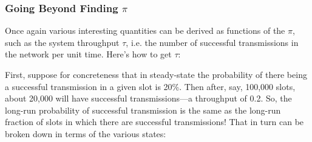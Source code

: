 % 
% 
% 
% 
% 
% 
% 
% 
% 

\subsubsection{Going Beyond Finding $\pi$}  
\label{firstib}

Once again various interesting quantities can be derived as functions of
the $\pi$, such as the system throughput $\tau$, i.e. the number of
successful transmissions in the network per unit time.  Here's how to
get $\tau$:

First, suppose for concreteness that in steady-state the probability of
there being a successful transmission in a given slot is 20\%.  Then
after, say, 100,000 slots, about 20,000 will have successful
transmissions---a throughput of 0.2.  So, the long-run probability of
successful transmission is the same as the long-run fraction of slots in
which there are successful transmissions!  That in turn can be broken
down in terms of the various states:


